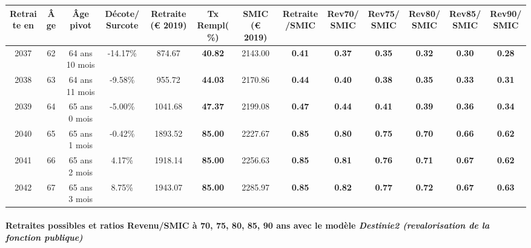 { \scriptsize \begin{center} 
\begin{tabular}[htb]{|c|c||c|c||c|c||c||c|c|c|c|c|c|} 
\hline 
 Retraite en &  Âge &  Âge pivot &  Décote/Surcote &  Retraite (\euro{} 2019) &  Tx Rempl(\%) &  SMIC (\euro{} 2019) &  Retraite/SMIC &  Rev70/SMIC &  Rev75/SMIC &  Rev80/SMIC &  Rev85/SMIC &  Rev90/SMIC \\ 
\hline \hline 
 2037 &  62 &  64 ans 10 mois &  -14.17\% &  874.67 &  {\bf 40.82} &  2143.00 &  {\bf {\color{red} 0.41}} &  {\bf {\color{red} 0.37}} &  {\bf {\color{red} 0.35}} &  {\bf {\color{red} 0.32}} &  {\bf {\color{red} 0.30}} &  {\bf {\color{red} 0.28}} \\ 
\hline 
 2038 &  63 &  64 ans 11 mois &  -9.58\% &  955.72 &  {\bf 44.03} &  2170.86 &  {\bf {\color{red} 0.44}} &  {\bf {\color{red} 0.40}} &  {\bf {\color{red} 0.38}} &  {\bf {\color{red} 0.35}} &  {\bf {\color{red} 0.33}} &  {\bf {\color{red} 0.31}} \\ 
\hline 
 2039 &  64 &  65 ans 0 mois &  -5.00\% &  1041.68 &  {\bf 47.37} &  2199.08 &  {\bf {\color{red} 0.47}} &  {\bf {\color{red} 0.44}} &  {\bf {\color{red} 0.41}} &  {\bf {\color{red} 0.39}} &  {\bf {\color{red} 0.36}} &  {\bf {\color{red} 0.34}} \\ 
\hline 
 2040 &  65 &  65 ans 1 mois &  -0.42\% &  1893.52 &  {\bf 85.00} &  2227.67 &  {\bf {\color{red} 0.85}} &  {\bf {\color{red} 0.80}} &  {\bf {\color{red} 0.75}} &  {\bf {\color{red} 0.70}} &  {\bf {\color{red} 0.66}} &  {\bf {\color{red} 0.62}} \\ 
\hline 
 2041 &  66 &  65 ans 2 mois &  4.17\% &  1918.14 &  {\bf 85.00} &  2256.63 &  {\bf {\color{red} 0.85}} &  {\bf {\color{red} 0.81}} &  {\bf {\color{red} 0.76}} &  {\bf {\color{red} 0.71}} &  {\bf {\color{red} 0.67}} &  {\bf {\color{red} 0.62}} \\ 
\hline 
 2042 &  67 &  65 ans 3 mois &  8.75\% &  1943.07 &  {\bf 85.00} &  2285.97 &  {\bf {\color{red} 0.85}} &  {\bf {\color{red} 0.82}} &  {\bf {\color{red} 0.77}} &  {\bf {\color{red} 0.72}} &  {\bf {\color{red} 0.67}} &  {\bf {\color{red} 0.63}} \\ 
\hline 
\hline 
\end{tabular} 
\end{center} } 
\paragraph{Retraites possibles et ratios Revenu/SMIC à 70, 75, 80, 85, 90 ans avec le modèle \emph{Destinie2 (revalorisation de la fonction publique)}}  
 

